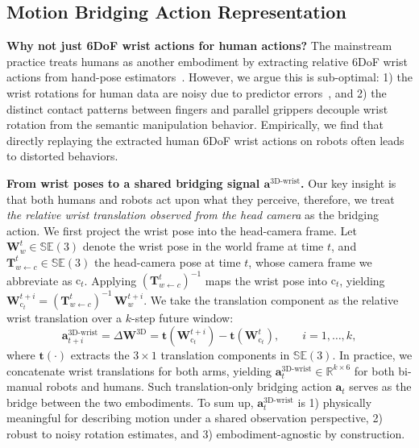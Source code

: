 \documentclass{llmxive}
\providecommand{\myparagraph}[1]{\vspace{0.1em}\noindent\textbf{#1}}
\begin{document}
\subsection{Motion Bridging Action Representation}
\label{sec:method:action_repr}


\myparagraph{Why not just 6DoF wrist actions for human actions?}
% 
The mainstream practice treats humans as another embodiment by extracting relative 6DoF wrist actions from hand-pose estimators~\cite{kareer2025egomimic,kareer2025emergence,cheang2025gr3,yuan2025motiontrans,zheng2026egoscale}.
% 
However, we argue this is sub-optimal: 1) the wrist rotations for human data are noisy due to predictor errors~\cite{wei2026one}, and 2) the distinct contact patterns between fingers and parallel grippers decouple wrist rotation from the semantic manipulation behavior. 
% 
Empirically, we find that directly replaying the extracted human 6DoF wrist actions on robots often leads to distorted behaviors.


\myparagraph{From wrist poses to a shared bridging signal $\mathbf{a}^{\text{3D-wrist}}$.}
%
Our key insight is that both humans and robots act upon what they perceive, therefore, we treat \emph{the relative wrist translation observed from the head camera} as the bridging action.
% 
We first project the wrist pose into the head-camera frame.
% 
Let $\mathbf{W}^{t}_{w}\!\in\!\mathbb{SE}(3)$ denote the wrist pose in the world frame at time $t$, and $\mathbf{T}^{t}_{w\leftarrow c}\!\in\!\mathbb{SE}(3)$ the head-camera pose at time $t$, whose camera frame we abbreviate as $\mathrm{c}_t$.
%
Applying $(\mathbf{T}^{t}_{w\leftarrow c})^{-1}$ maps the wrist pose into $\mathrm{c}_t$, yielding $\mathbf{W}^{t+i}_{\mathrm{c}_t} = (\mathbf{T}^{t}_{w\leftarrow c})^{-1}\,\mathbf{W}^{t+i}_{w}$. 
% 
We take the translation component as the relative wrist translation over a $k$-step future window:
%
\begin{equation}
\boldsymbol{a}^{\text{3D-wrist}}_{t+i}
= \Delta \mathbf{W}^{\text{3D}}
= \boldsymbol{t}\!\left( \mathbf{W}^{t+i}_{\mathrm{c}_t} \right)
- \boldsymbol{t}\!\left( \mathbf{W}_{\mathrm{c}_t}^{t} \right), \qquad i = 1, \dots, k,
\end{equation}
%
where $\boldsymbol{t}(\cdot)$ extracts the $3\!\times\!1$ translation components in $\mathbb{SE}(3)$. 
% 
In practice, we concatenate wrist translations for both arms, yielding $\mathbf{a}_{t}^{\text{3D-wrist}}\!\in\!\mathbb{R}^{k\times 6}$  for both bi-manual robots and humans.
% 
Such translation-only bridging action $\mathbf{a}_{t}$ serves as the bridge between the two embodiments.
% 
To sum up, $\mathbf{a}_{t}^{\text{3D-wrist}}$ is 1) physically meaningful for describing motion under a shared observation perspective, 2) robust to noisy rotation estimates, and 3) embodiment-agnostic by construction.
\end{document}
